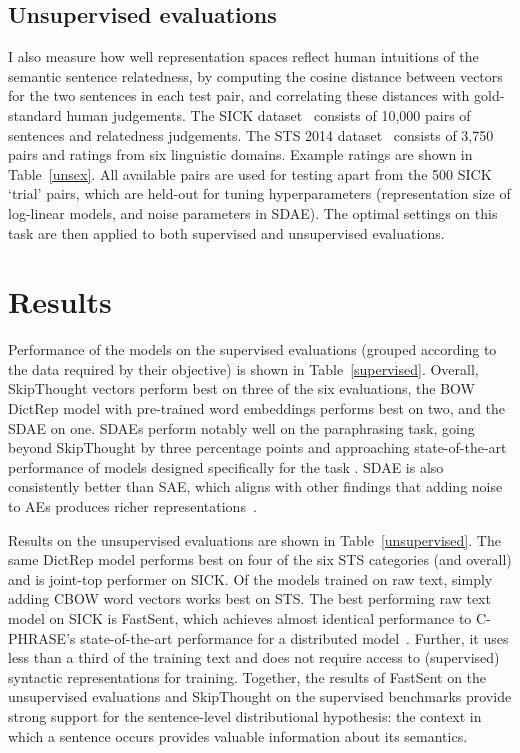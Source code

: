 \subsection{Unsupervised evaluations}
\label{unseval}
I also measure how well representation spaces reflect human intuitions of the semantic sentence relatedness, by computing the cosine distance between vectors for the two sentences in each test pair, and correlating these distances with gold-standard human judgements. The SICK dataset~\citep{marelli2014sick} consists of 10,000 pairs of sentences and relatedness judgements. The STS 2014 dataset~\citep{agirre2014semeval} consists of 3,750 pairs and ratings from six linguistic domains. Example ratings are shown in Table~\ref{unsex}. All available pairs are used for testing apart from the 500 SICK `trial' pairs, which are held-out for tuning hyperparameters (representation size of log-linear models, and noise parameters in SDAE). The optimal settings on this task are then applied to both supervised and unsupervised evaluations.  



\section{Results}

Performance of the models on the supervised evaluations (grouped according to the data required by their objective) is shown in Table~\ref{supervised}. Overall, SkipThought vectors perform best on three of the six evaluations, the BOW DictRep model with pre-trained word embeddings performs best on two, and the SDAE on one. SDAEs perform notably well on the paraphrasing task, going beyond SkipThought by three percentage points and approaching state-of-the-art performance of models designed specifically for the task \citep{ji2013discriminative}. SDAE is also consistently better than SAE, which aligns with other findings that adding noise to AEs produces richer representations~\citep{vincent2008extracting}.  

Results on the unsupervised evaluations are shown in Table~\ref{unsupervised}. The same DictRep model performs best on four of the six STS categories (and overall) and is joint-top performer on SICK. Of the models trained on raw text, simply adding CBOW word vectors works best on STS. The best performing raw text model on SICK is FastSent, which achieves almost identical performance to C-PHRASE's state-of-the-art performance for a distributed model~\citep{marcobaronijointly}. Further, it uses less than a third of the training text and does not require access to (supervised) syntactic representations for training. Together, the results of FastSent on the unsupervised evaluations and SkipThought on the supervised benchmarks provide strong support for the sentence-level distributional hypothesis: the context in which a sentence occurs provides valuable  information about its semantics.

